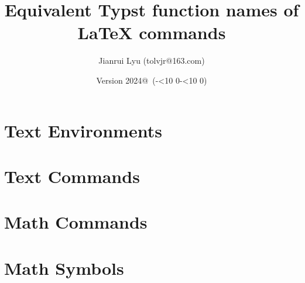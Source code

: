 \documentclass[oneside,12pt]{article}
\makeatletter
\newcommand*{\myversion}{2024@}
\newcommand*{\mydate}{Version \myversion\ (\the\year-\mylpad\month-\mylpad\day)}
\newcommand*{\mylpad}[1]{\ifnum#1<10 0\the#1\else\the#1\fi}
\makeatother
\begin{document}
\title{\textsf{\color{green3}Equivalent Typst function names of LaTeX commands}}
\author{Jianrui Lyu (tolvjr@163.com)}
\date{\mydate}
\maketitle

\section{Text Environments}


\section{Text Commands}


\section{Math Commands}


\section{Math Symbols}

\end{document}
